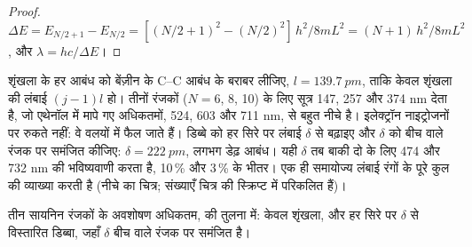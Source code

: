 \begin{proof}
$\Delta E = E_{N/2+1} - E_{N/2} = [(N/2+1)^2 - (N/2)^2]\,h^2/8mL^2 =
(N+1)\,h^2/8mL^2$, और $\lambda = hc/\Delta E$।
\end{proof}

\begin{example}[केवल शृंखला वाला डिब्बा विफल, विस्तारित डिब्बा सफल]\label{ex:b3:quantum-model-systems:dyes}
शृंखला के हर आबंध को बेंज़ीन के C--C आबंध के बराबर लीजिए,
$l = \qty{139.7}{pm}$, ताकि केवल शृंखला की लंबाई $(j - 1)l$ हो।
तीनों रंजकों ($N = 6$, 8, 10) के लिए सूत्र 147, 257 और 374 nm देता है, जो
एथेनॉल में मापे गए अधिकतमों, 524, 603 और 711 nm, से बहुत नीचे है। इलेक्ट्रॉन
नाइट्रोजनों पर रुकते नहीं: वे वलयों में फैल जाते हैं। डिब्बे को
हर सिरे पर लंबाई $\delta$ से बढ़ाइए और $\delta$ को बीच वाले रंजक पर समंजित कीजिए:
$\delta = \qty{222}{pm}$, लगभग डेढ़ आबंध। यही $\delta$ तब
बाकी दो के लिए 474 और 732 nm की भविष्यवाणी करता है, 10\,\% और 3\,\% के भीतर। एक ही
समायोज्य लंबाई रंगों के पूरे कुल की व्याख्या करती है (नीचे का चित्र; संख्याएँ
चित्र की स्क्रिप्ट में परिकलित हैं)।
\end{example}

\begin{omfigure}

{\small तीन सायनिन रंजकों के अवशोषण अधिकतम,  की तुलना में:
केवल शृंखला, और हर सिरे पर $\delta$ से विस्तारित डिब्बा, जहाँ $\delta$ बीच वाले
रंजक पर समंजित है।}
\end{omfigure}

